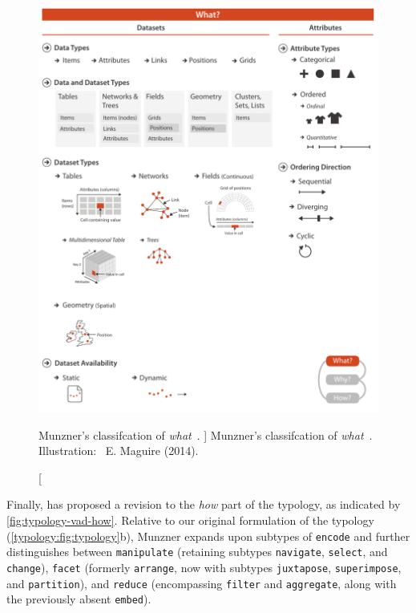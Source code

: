 
\begin{figure}
	\centering
    \includegraphics[width=\textwidth]{figures/fig2-1.pdf}
    \caption
    [
        Munzner's classifcation of \textsl{what}~\cite{Munzner2014}.
    ]
    {
        Munzner's classifcation of \textsl{what}~\cite{Munzner2014}. Illustration: \ccLogo~E. Maguire (2014).
    }
	\centering
	\label{fig:typology-vad-what}
\end{figure}


Finally, \citet{Munzner2014} has proposed a revision to the {\it how} part of the typology, as indicated by \autoref{fig:typology-vad-how}. 
Relative to our original formulation of the typology (\cf \autoref{typology:fig:typology}b), Munzner expands upon subtypes of {\tt encode} and further distinguishes between {\tt manipulate} (retaining subtypes {\tt navigate}, {\tt select}, and {\tt change}), {\tt facet} (formerly {\tt arrange}, now with subtypes {\tt juxtapose}, {\tt superimpose}, and {\tt partition}), and {\tt reduce} (encompassing {\tt filter} and {\tt aggregate}, along with the previously absent {\tt embed}).


